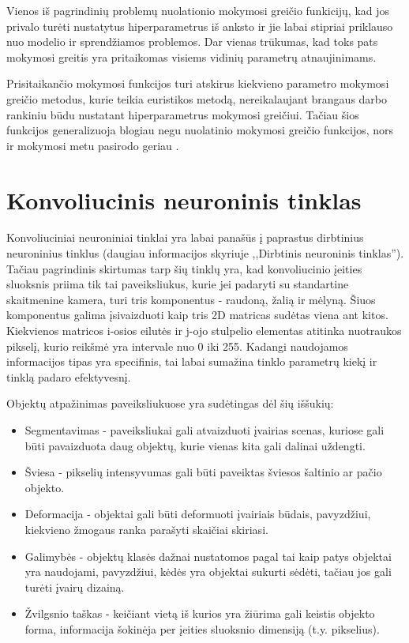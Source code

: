 \documentclass{VUMIFPSkursinis}
\begin{document}
Vienos iš pagrindinių problemų nuolationio mokymosi greičio funkicijų, kad jos privalo turėti nustatytus hiperparametrus 
iš anksto ir jie labai stipriai priklauso nuo modelio ir sprendžiamos problemos. Dar vienas trūkumas, kad toks pats 
mokymosi greitis yra pritaikomas visiems vidinių parametrų atnaujinimams.

Prisitaikančio mokymosi funkcijos turi atskirus kiekvieno parametro mokymosi greičio metodus, kurie teikia euristikos 
metodą, nereikalaujant brangaus darbo rankiniu būdu nustatant hiperparametrus mokymosi greičiui. Tačiau šios funkcijos 
generalizuoja blogiau negu nuolatinio mokymosi greičio funkcijos, nors ir mokymosi metu pasirodo geriau \cite{2017arXiv170508292W}.


\section{Konvoliucinis neuroninis tinklas}
Konvoliuciniai neuroniniai tinklai yra labai panašūs į paprastus dirbtinius neuroninius tinklus (daugiau informacijos skyriuje ,,Dirbtinis neuroninis
tinklas''). Tačiau pagrindinis skirtumas tarp šių tinklų yra, kad konvoliucinio įeities sluoksnis priima tik tai paveiksliukus, 
kurie jei padaryti su standartine skaitmenine kamera, turi tris komponentus - raudoną, žalią ir mėlyną. Šiuos komponentus galima 
įsivaizduoti kaip tris 2D matricas sudėtas viena ant kitos. Kiekvienos matricos i-osios eilutės ir j-ojo stulpelio elementas 
atitinka nuotraukos pikselį, kurio reikšmė yra intervale nuo 0 iki 255. Kadangi naudojamos informacijos tipas yra specifinis, 
tai labai sumažina tinklo parametrų kiekį ir tinklą padaro efektyvesnį.


Objektų atpažinimas paveiksliukuose yra sudėtingas dėl šių iššukių:
\begin{itemize}
\item Segmentavimas - paveiksliukai gali atvaizduoti įvairias scenas, kuriose gali būti pavaizduota daug objektų, kurie vienas kita gali dalinai uždengti.
\item Šviesa - pikselių intensyvumas gali būti paveiktas šviesos šaltinio ar pačio objekto.
\item Deformacija - objektai gali būti deformuoti įvairiais būdais, pavyzdžiui, kiekvieno žmogaus ranka parašyti skaičiai skiriasi.
\item Galimybės - objektų klasės dažnai nustatomos pagal tai kaip patys objektai yra naudojami, pavyzdžiui, kėdės yra objektai sukurti sėdėti, tačiau jos gali turėti įvairų dizainą.
\item Žvilgsnio taškas - keičiant vietą iš kurios yra žiūrima gali keistis objekto forma, informacija šokinėja per įeities sluoksnio dimensiją (t.y. pikselius). 
\end{itemize}
\end{document}
